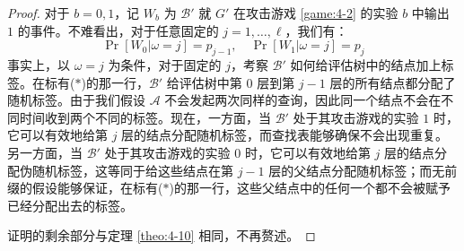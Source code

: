 \begin{proof}
对于 $b=0,1$，记 $W_b$ 为 $\mathcal{B}'$ 就 $G'$ 在攻击游戏 \ref{game:4-2} 的实验 $b$ 中输出 $1$ 的事件。不难看出，对于任意固定的 $j=1,\dots,\ell$，我们有：
\[
\Pr[W_0|\omega=j]=p_{j-1},
\quad
\Pr[W_1|\omega=j]=p_j
\]
事实上，以 $\omega=j$ 为条件，对于固定的 $j$，考察 $\mathcal{B}'$ 如何给评估树中的结点加上标签。在标有($*$)的那一行，$\mathcal{B}'$ 给评估树中第 $0$ 层到第 $j-1$ 层的所有结点都分配了随机标签。由于我们假设 $\mathcal{A}$ 不会发起两次同样的查询，因此同一个结点不会在不同时间收到两个不同的标签。现在，一方面，当 $\mathcal{B}'$ 处于其攻击游戏的实验 $1$ 时，它可以有效地给第 $j$ 层的结点分配随机标签，而查找表能够确保不会出现重复。另一方面，当 $\mathcal{B}'$ 处于其攻击游戏的实验 $0$ 时，它可以有效地给第 $j$ 层的结点分配伪随机标签，这等同于给这些结点在第 $j-1$ 层的父结点分配随机标签；而无前缀的假设能够保证，在标有($*$)的那一行，这些父结点中的任何一个都不会被赋予已经分配出去的标签。

证明的剩余部分与定理 \ref{theo:4-10} 相同，不再赘述。
\end{proof}